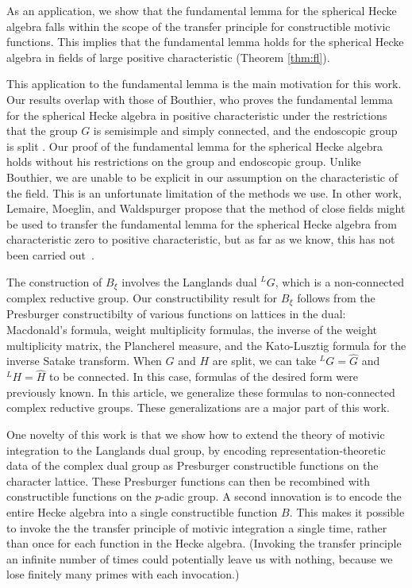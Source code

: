 As an application, we show that the fundamental lemma for the
spherical Hecke algebra falls within the scope of the transfer
principle for constructible motivic functions.  This implies that the
fundamental lemma holds for the spherical Hecke algebra in fields of
large positive characteristic (Theorem \ref{thm:fl}).

This application to the fundamental lemma is the main motivation for
this work.  Our results overlap with those of Bouthier, who proves the
fundamental lemma for the spherical Hecke algebra in positive
characteristic under the restrictions that the group $G$ is semisimple
and simply connected, and the endoscopic group is split
\cite[Theorem~0.2]{bouthier}.  Our proof of the fundamental lemma for
the spherical Hecke algebra holds without his restrictions on the
group and endoscopic group.  Unlike Bouthier, we are unable to be
explicit in our assumption on the characteristic of the field.  This
is an unfortunate limitation of the methods we use.  In other work,
Lemaire, Moeglin, and Waldspurger propose that the method of close
fields might be used to transfer the fundamental lemma for the
spherical Hecke algebra from characteristic zero to positive
characteristic, but as far as we know, this has not been carried
out~\cite[\S1.3]{LMW}.

The construction of $B_\xi$ involves the Langlands dual ${}^LG$, which
is a non-connected complex reductive group.  Our constructibility
result for $B_\xi$ follows from the Presburger constructibilty of
various functions on lattices in the dual: Macdonald's formula, weight
multiplicity formulas, the inverse of the weight multiplicity matrix,
the Plancherel measure, and the Kato-Lusztig formula for the inverse
Satake transform.  When $G$ and $H$ are split, we can take ${}^LG =
\hat G$ and ${}^LH=\hat H$ to be connected.  In this case, formulas of
the desired form were previously known.  In this article, we
generalize these formulas to non-connected complex reductive groups.
These generalizations are a major part of this work.

One novelty of this work is that we show how to extend the theory of
motivic integration to the Langlands dual group, by encoding
representation-theoretic data of the complex dual group as Presburger
constructible functions on the character lattice. These Presburger
functions can then be recombined with constructible functions on the
$p$-adic group.  A second innovation is to encode the entire Hecke
algebra into a single constructible function $B$.  This makes it
possible to invoke the the transfer principle of motivic integration a
single time, rather than once for each function in the Hecke algebra.
(Invoking the transfer principle an infinite number of times could
potentially leave us with nothing, because we lose finitely many
primes with each invocation.)

